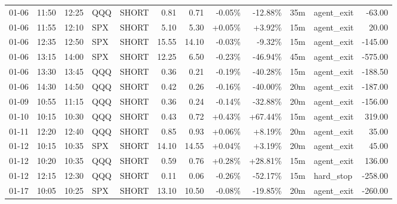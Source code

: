 \documentclass[11pt,a4paper]{article}
\begin{document}
\begin{center}
\begin{longtable}{>{\color{txtmain}}l l l l l r r r r r >{\color{txtmain}}l r}
01-06 & 11:50 & 12:25 & QQQ & SHORT & 0.81 & 0.71 & \textcolor{lossred}{-0.05\%} & \textcolor{lossred}{-12.88\%} & 35m & agent\_exit & \textcolor{lossred}{-63.00} \\
01-06 & 11:55 & 12:10 & SPX & SHORT & 5.10 & 5.30 & \textcolor{wingreen}{+0.05\%} & \textcolor{wingreen}{+3.92\%} & 15m & agent\_exit & \textcolor{wingreen}{20.00} \\
01-06 & 12:35 & 12:50 & SPX & SHORT & 15.55 & 14.10 & \textcolor{lossred}{-0.03\%} & \textcolor{lossred}{-9.32\%} & 15m & agent\_exit & \textcolor{lossred}{-145.00} \\
01-06 & 13:15 & 14:00 & SPX & SHORT & 12.25 & 6.50 & \textcolor{lossred}{-0.23\%} & \textcolor{lossred}{-46.94\%} & 45m & agent\_exit & \textcolor{lossred}{-575.00} \\
01-06 & 13:30 & 13:45 & QQQ & SHORT & 0.36 & 0.21 & \textcolor{lossred}{-0.19\%} & \textcolor{lossred}{-40.28\%} & 15m & agent\_exit & \textcolor{lossred}{-188.50} \\
01-06 & 14:30 & 14:50 & QQQ & SHORT & 0.42 & 0.26 & \textcolor{lossred}{-0.16\%} & \textcolor{lossred}{-40.00\%} & 20m & agent\_exit & \textcolor{lossred}{-187.00} \\
01-09 & 10:55 & 11:15 & QQQ & SHORT & 0.36 & 0.24 & \textcolor{lossred}{-0.14\%} & \textcolor{lossred}{-32.88\%} & 20m & agent\_exit & \textcolor{lossred}{-156.00} \\
01-10 & 10:15 & 10:30 & QQQ & SHORT & 0.43 & 0.72 & \textcolor{wingreen}{+0.43\%} & \textcolor{wingreen}{+67.44\%} & 15m & agent\_exit & \textcolor{wingreen}{319.00} \\
01-11 & 12:20 & 12:40 & QQQ & SHORT & 0.85 & 0.93 & \textcolor{wingreen}{+0.06\%} & \textcolor{wingreen}{+8.19\%} & 20m & agent\_exit & \textcolor{wingreen}{35.00} \\
01-12 & 10:15 & 10:35 & SPX & SHORT & 14.10 & 14.55 & \textcolor{wingreen}{+0.04\%} & \textcolor{wingreen}{+3.19\%} & 20m & agent\_exit & \textcolor{wingreen}{45.00} \\
01-12 & 10:20 & 10:35 & QQQ & SHORT & 0.59 & 0.76 & \textcolor{wingreen}{+0.28\%} & \textcolor{wingreen}{+28.81\%} & 15m & agent\_exit & \textcolor{wingreen}{136.00} \\
01-12 & 12:15 & 12:30 & QQQ & SHORT & 0.11 & 0.06 & \textcolor{lossred}{-0.26\%} & \textcolor{lossred}{-52.17\%} & 15m & hard\_stop & \textcolor{lossred}{-258.00} \\
01-17 & 10:05 & 10:25 & SPX & SHORT & 13.10 & 10.50 & \textcolor{lossred}{-0.08\%} & \textcolor{lossred}{-19.85\%} & 20m & agent\_exit & \textcolor{lossred}{-260.00} \\

\end{longtable}
\end{center}
\end{document}
